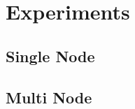 \chapter{Experiments}\label{chpt:experiments}
\thispagestyle{chaptertitle} %


\section{Single Node}

\section{Multi Node}

